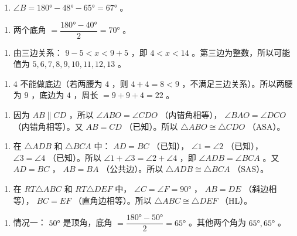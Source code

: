 \begin{answer}


\begin{enumerate}
  \item $\angle B = 180° - 48° - 65° = 67°$ 。
\end{enumerate}


\begin{enumerate}
  \item 两个底角 $= \dfrac{180° - 40°}{2} = 70°$ 。
\end{enumerate}


\begin{enumerate}
  \item 由三边关系： $9 - 5 < x < 9 + 5$ ，即 $4 < x < 14$ 。第三边为整数，所以可能值为 $5, 6, 7, 8, 9, 10, 11, 12, 13$ 。
\end{enumerate}


\begin{enumerate}
  \item $4$ 不能做底边（若两腰为 $4$ ，则 $4 + 4 = 8 < 9$ ，不满足三边关系）。所以两腰为 $9$ ，底边为 $4$ ，周长 $= 9 + 9 + 4 = 22$ 。
\end{enumerate}


\begin{enumerate}
  \item 因为 $AB \parallel CD$ ，所以 $\angle ABO = \angle CDO$ （内错角相等）， $\angle BAO = \angle DCO$ （内错角相等）。又 $AB = CD$ （已知）。所以 $\triangle ABO \cong \triangle CDO$ （ASA）。
\end{enumerate}


\begin{enumerate}
  \item 在 $\triangle ADB$ 和 $\triangle BCA$ 中： $AD = BC$ （已知）， $\angle 1 = \angle 2$ （已知）， $\angle 3 = \angle 4$ （已知）。所以 $\angle 1 + \angle 3 = \angle 2 + \angle 4$ ，即 $\angle ADB = \angle BCA$ 。又 $AD = BC$ ， $AB = BA$ （公共边）。所以 $\triangle ADB \cong \triangle BCA$ （SAS）。
\end{enumerate}


\begin{enumerate}
  \item 在 $RT\triangle ABC$ 和 $RT\triangle DEF$ 中， $\angle C = \angle F = 90°$ ， $AB = DE$ （斜边相等）， $BC = EF$ （直角边相等）。所以 $\triangle ABC \cong \triangle DEF$ （HL）。
\end{enumerate}


\begin{enumerate}
  \item 情况一： $50°$ 是顶角，底角 $= \dfrac{180° - 50°}{2} = 65°$ 。其他两个角为 $65°, 65°$ 。
\end{enumerate}


\end{answer}
